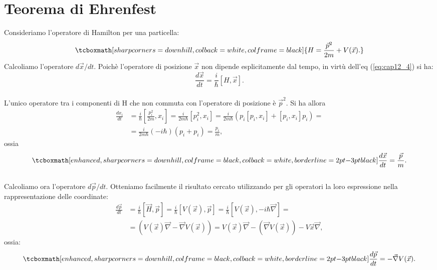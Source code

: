 \documentclass[a4paper,12pt,oneside]{book}
\begin{document}
\section[Teorema di Ehrenfest]{Teorema di Ehrenfest}
Consideriamo l'operatore di Hamilton per una particella:
	\begin{equation}
		\tcboxmath[sharp corners=downhill, colback=white, colframe=black]{
			H= \frac{\vec{p}^2}{2m} + {V}(\vec{x}).
			}
	\end{equation}
Calcoliamo l'operatore $d\vec{x}/dt$. Poichè l'operatore di posizione $\vec{x}$ non dipende esplicitamente dal tempo, in virtù dell'eq (\ref{eq:cap12_4}) si ha:
	\begin{equation}
		\frac{d\vec{x}}{dt}= \frac{i}{\hbar}[H,\vec{x}].
	\end{equation}\\

L'unico operatore tra i componenti di H che non commuta con l'operatore di posizione è $\vec{p}^2$. Si ha allora 
	\begin{align}
		\frac{dx_i}{dt}&=\frac{i}{\hbar} \left[ \frac{p_i^2}{2m},x_i \right]= \frac{i}{2m\hbar}\left[ p_i ^2 ,x_i \right] = \frac{i}{2m\hbar}\left(p_i\left[ p_i, x_i\right]+\left[p_i , x_i \right]p_i\right)= \nonumber \\
		&= \frac{i}{2m\hbar }\left( -i\hbar \right) \left( p_i +p_i \right)=\frac{p_i}{m},
	\end{align}
ossia
	\begin{equation}
   	\label{eq:cap12_6}
		\tcboxmath[enhanced, sharp corners=downhill, colframe=black, colback=white, borderline={2pt}{-3pt}{black}]{
			\frac{d\vec{x}}{dt}=\frac{\vec{p}}{m}.
			}
	\end{equation}\\
	
Calcoliamo ora l'operatore ${d\vec{p}}/{dt}$. Otteniamo facilmente il risultato cercato utilizzando per gli operatori la loro espressione nella rappresentazione delle coordinate:\\
	\begin{align}
		\frac{d\vec{p}}{dt}&=\frac{i}{\hbar}[\vec{H},\vec{p}]=\frac{i}{\hbar}[V(\vec{x}),\vec{p}]=  \frac{i}{\hbar}[V(\vec{x}),-i\hbar\vec{\nabla}]= \nonumber \\
		&= (V(\vec{x})\vec{\nabla}-\vec{\nabla}V(\vec{x}))= V(\vec{x})\vec{\nabla}-(\vec{\nabla}V(\vec{x}))-V	\vec{x}\vec{\nabla},
	\end{align}
ossia:
	\begin{equation}
	\label{eq:cap12_7}
		\tcboxmath[enhanced, sharp corners=downhill, colframe=black, colback=white, borderline={2pt}{-3pt}{black}]{
			\frac{d\vec{p}}{dt}=-\vec{\nabla}V(\vec{x}).
			}
	\end{equation}\\
	
\end{document}

